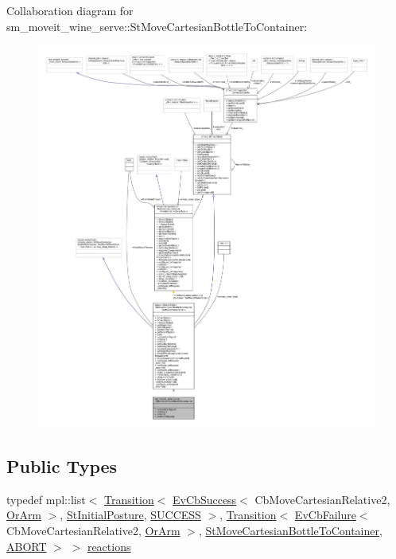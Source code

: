 Collaboration diagram for sm\+\_\+moveit\+\_\+wine\+\_\+serve\+:\+:St\+Move\+Cartesian\+Bottle\+To\+Container\+:
\nopagebreak
\begin{figure}[H]
\begin{center}
\leavevmode
\includegraphics[width=350pt]{structsm__moveit__wine__serve_1_1StMoveCartesianBottleToContainer__coll__graph}
\end{center}
\end{figure}
\subsection*{Public Types}
\begin{DoxyCompactItemize}
\item 
typedef mpl\+::list$<$ \hyperlink{classsmacc_1_1Transition}{Transition}$<$ \hyperlink{structsmacc_1_1EvCbSuccess}{Ev\+Cb\+Success}$<$ Cb\+Move\+Cartesian\+Relative2, \hyperlink{classsm__moveit__wine__serve_1_1OrArm}{Or\+Arm} $>$, \hyperlink{structsm__moveit__wine__serve_1_1StInitialPosture}{St\+Initial\+Posture}, \hyperlink{structsmacc_1_1default__transition__tags_1_1SUCCESS}{S\+U\+C\+C\+E\+SS} $>$, \hyperlink{classsmacc_1_1Transition}{Transition}$<$ \hyperlink{structsmacc_1_1EvCbFailure}{Ev\+Cb\+Failure}$<$ Cb\+Move\+Cartesian\+Relative2, \hyperlink{classsm__moveit__wine__serve_1_1OrArm}{Or\+Arm} $>$, \hyperlink{structsm__moveit__wine__serve_1_1StMoveCartesianBottleToContainer}{St\+Move\+Cartesian\+Bottle\+To\+Container}, \hyperlink{structsmacc_1_1default__transition__tags_1_1ABORT}{A\+B\+O\+RT} $>$ $>$ \hyperlink{structsm__moveit__wine__serve_1_1StMoveCartesianBottleToContainer_a2350684d3e94c8b2713c13a0ecc73de8}{reactions}
\end{DoxyCompactItemize}
